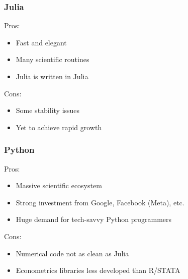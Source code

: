 \begin{frame}
    \frametitle{Julia}

    Pros:
    
    \begin{itemize}
        \item Fast and elegant
            \vspace{0.5em}
        \item Many scientific routines
            \vspace{0.5em}
        \item Julia is written in Julia
    \end{itemize}

            \vspace{0.5em}
            \vspace{0.5em}
            \vspace{0.5em}
    Cons:
    
    \begin{itemize}
        \item Some stability issues
            \vspace{0.5em}
        \item Yet to achieve rapid growth
    \end{itemize}

\end{frame}




\begin{frame}
    \frametitle{Python}

    Pros:
    
    \begin{itemize}
        \item Massive scientific ecosystem
            \vspace{0.5em}
        \item Strong investment from Google, Facebook (Meta), etc.
            \vspace{0.5em}
        \item Huge demand for tech-savvy Python programmers
    \end{itemize}


            \vspace{0.5em}
            \vspace{0.5em}
    Cons:
    
    \begin{itemize}
        \item Numerical code not as clean as Julia
            \vspace{0.5em}
        \item Econometrics libraries less developed than R/STATA
    \end{itemize}

\end{frame}




